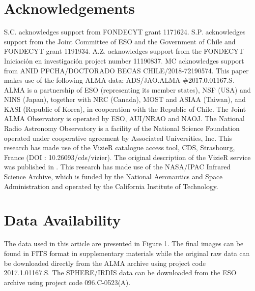 \documentclass[fleqn,usenatbib,useAMS]{mnras}
\begin{document}
\section*{Acknowledgements}

S.C. acknowledges support from FONDECYT grant 1171624. S.P. acknowledges support from the Joint Committee of ESO and the Government of Chile and FONDECYT grant 1191934. A.Z. acknowledges support from the FONDECYT Iniciaci\'on en investigaci\'on project number 11190837. MC acknowledges support from ANID PFCHA/DOCTORADO BECAS CHILE/2018-72190574. This paper makes use of the following ALMA data: ADS/JAO.ALMA \#2017.0.01167.S. ALMA is a partnership of ESO (representing its member states), NSF (USA) and NINS (Japan), together with NRC (Canada), MOST and ASIAA (Taiwan), and KASI (Republic of Korea), in cooperation with the Republic of Chile. The Joint ALMA Observatory is operated by ESO, AUI/NRAO and NAOJ. The National Radio Astronomy Observatory is a facility of the National Science Foundation operated under cooperative agreement by Associated Universities, Inc. This research has made use of the VizieR catalogue access tool, CDS, Strasbourg, France (DOI : 10.26093/cds/vizier). The original description of the VizieR service was published in \citet{2000A&AS..143...23O}. This research has made use of the NASA/IPAC Infrared Science Archive, which is funded by the National Aeronautics and Space Administration and operated by the California Institute of Technology. 

\section*{Data Availability}

The data used in this article are presented in Figure 1.  The final images can be found in FITS format in supplementary materials while the original raw data can be downloaded directly from the ALMA archive using project code 2017.1.01167.S.  The SPHERE/IRDIS data can be downloaded from the ESO archive using project code 096.C-0523(A).











\bsp	%
\label{lastpage}
\end{document}
